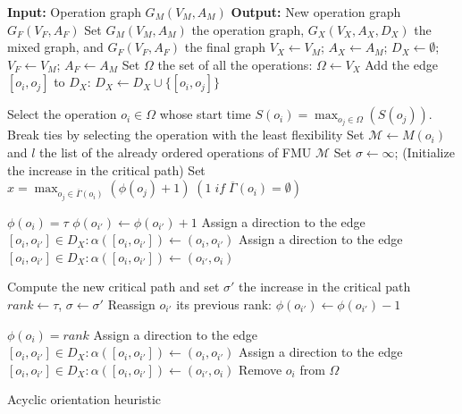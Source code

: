 \begin{algorithm}[htb]		
		\textbf{Input:} Operation graph $G_M(V_M,A_M)$\;
		\textbf{Output:} New operation graph $G_F(V_F,A_F)$\;
		Set $G_M(V_M,A_M)$ the operation graph, $G_X(V_X,A_X,D_X)$ the mixed graph, and $G_F(V_F,A_F)$ the final graph\;
		$V_X \leftarrow V_M$; $A_X \leftarrow A_M$; $D_X \leftarrow \emptyset$; $V_F \leftarrow V_M$; $A_F \leftarrow A_M$\;
		Set $\Omega$ the set of all the operations: $\Omega \leftarrow V_X$\;  
		{
				Add the edge $[o_i,o_j]$ to $D_X$: $D_X \leftarrow D_X \cup \{[o_i,o_j]\}$
		}
		\While{$\Omega \neq \emptyset$}
		{
			Select the operation $o_i \in \Omega$ whose start time $S(o_i) = \max_{o_j \in \Omega}(S(o_j))$. Break ties by selecting the operation with the least flexibility\;
			Set $\mathcal{M} \leftarrow M(o_i)$ and $l$ the list of the already ordered operations of FMU $\mathcal{M}$\;
			Set $\sigma \leftarrow \infty$; (Initialize the increase in the critical path)\;
			Set $x = \max_{o_j \in {\overline{\Gamma}}(o_i)}(\phi(o_j)+1)\; (1 \; if \; {\overline{\Gamma}}(o_i) = \emptyset)$\;
			{
				$\phi(o_i)=\tau$\;
				{
					$\phi(o_{i'}) \leftarrow \phi(o_{i'}) + 1$
				}
				{
					{
						Assign a direction to the edge $[o_i,o_{i'}] \in D_X: \alpha([o_i,o_{i'}]) \leftarrow (o_i,o_{i'})$
					}
					\lElse
					{
						Assign a direction to the edge $[o_i,o_{i'}] \in D_X: \alpha([o_i,o_{i'}]) \leftarrow (o_{i'},o_i)$
					}
				}
				
				Compute the new critical path and set $\sigma'$ the increase in the critical path\;
				{
					$rank \leftarrow \tau$,
					$\sigma \leftarrow \sigma'$
				}
				{
					Reassign $o_{i'}$ its previous rank: $\phi(o_{i'}) \leftarrow \phi(o_{i'})-1$
				}
			}
			$\phi(o_i)=rank$\;
			{
				{
					Assign a direction to the edge $[o_i,o_{i'}] \in D_X: \alpha([o_i,o_{i'}])\leftarrow (o_i,o_{i'})$
				}
				\lElse
				{
					Assign a direction to the edge $[o_i,o_{i'}] \in D_X: \alpha([o_i,o_{i'}])\leftarrow (o_{i'},o_i)$
				}
			}
			Remove $o_i$ from $\Omega$\;
		}
	\caption{Acyclic orientation heuristic}
	\label{algo:ao}
\end{algorithm}

